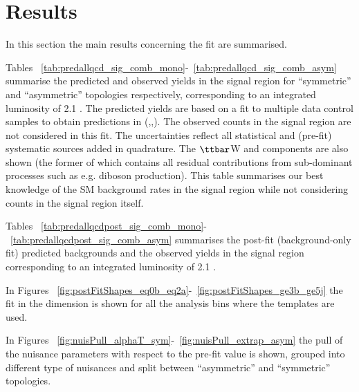 \section{Results}
\label{sec:results}

In this section the main results concerning the fit are summarised. 

Tables ~\ref{tab:predallqcd_sig_comb_mono}-~\ref{tab:predallqcd_sig_comb_asym} summarise the predicted and observed yields in the signal region for ``symmetric'' and ``asymmetric'' topologies respectively, 
corresponding to an integrated luminosity of 2.1 \ifb.
The predicted yields are based on a fit to multiple data control samples to obtain predictions in (\nj,\nb,\scalht). 
The observed counts in the signal region are not considered in this fit. 
The uncertainties reflect all statistical and (pre-fit) systematic sources added in quadrature. 
The $\ttbar$W and \znunu components are also shown (the former of which contains all residual contributions from sub-dominant processes such as e.g. diboson production). 
This table summarises our best knowledge of the SM background rates in the signal region while not considering counts in the signal region itself. 




\clearpage

Tables ~\ref{tab:predallqcdpost_sig_comb_mono}-~\ref{tab:predallqcdpost_sig_comb_asym} summarises the post-fit (background-only fit) predicted backgrounds and the 
observed yields in the signal region corresponding to an integrated luminosity of 2.1 \ifb. 




\clearpage
In Figures ~\ref{fig:postFitShapes_eq0b_eq2a}-~\ref{fig:postFitShapes_ge3b_ge5j} the fit in the \MHT dimension is shown for all the analysis bins where the \MHT templates are used.

In Figures ~\ref{fig:nuisPull_alphaT_sym}-~\ref{fig:nuisPull_extrap_asym} the pull of the nuisance parameters with respect to the pre-fit value is shown, 
grouped into different type of nuisances and split between ``asymmetric'' and ``symmetric'' topologies.


